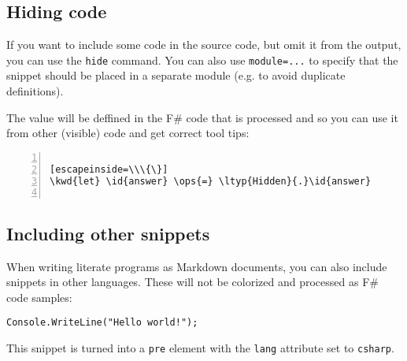 \documentclass{article}
\newcommand{\id}[1]{\textcolor{black}{#1}}
\newcommand{\kwd}[1]{\textcolor{navy}{#1}}
\newcommand{\ops}[1]{\textcolor{purple}{#1}}
\begin{document}
\subsection*{Hiding code}



If you want to include some code in the source code,
but omit it from the output, you can use the \texttt{hide}
command. You can also use \texttt{module=...} to specify that
the snippet should be placed in a separate module
(e.g. to avoid duplicate definitions).


The value will be deffined in the F\# code that is
processed and so you can use it from other (visible)
code and get correct tool tips:
\begin{lstlisting}[numbers=left]

[escapeinside=\\\{\}]
\kwd{let} \id{answer} \ops{=} \ltyp{Hidden}{.}\id{answer}


\end{lstlisting}

\subsection*{Including other snippets}



When writing literate programs as Markdown documents,
you can also include snippets in other languages.
These will not be colorized and processed as F\#
code samples:
\begin{lstlisting}
Console.WriteLine("Hello world!");

\end{lstlisting}


This snippet is turned into a \texttt{pre} element with the
\texttt{lang} attribute set to \texttt{csharp}.
\end{document}
